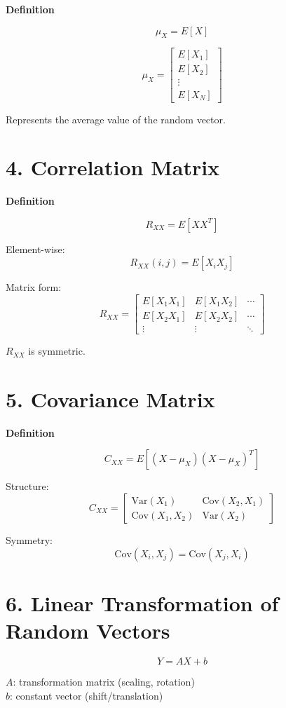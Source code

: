 \documentclass[12pt]{article}
\begin{document}
\textbf{Definition}

\[
\mu_X = E[X]
\]

\[
\mu_X =
\begin{bmatrix}
E[X_1] \\
E[X_2] \\
\vdots \\
E[X_N]
\end{bmatrix}
\]

Represents the average value of the random vector.

\section*{4. Correlation Matrix}

\textbf{Definition}

\[
R_{XX} = E[XX^T]
\]

Element-wise:
\[
R_{XX}(i,j) = E[X_i X_j]
\]

Matrix form:
\[
R_{XX} =
\begin{bmatrix}
E[X_1 X_1] & E[X_1 X_2] & \cdots \\
E[X_2 X_1] & E[X_2 X_2] & \cdots \\
\vdots & \vdots & \ddots
\end{bmatrix}
\]

$R_{XX}$ is symmetric.

\section*{5. Covariance Matrix}

\textbf{Definition}

\[
C_{XX} = E[(X - \mu_X)(X - \mu_X)^T]
\]

Structure:
\[
C_{XX} =
\begin{bmatrix}
\text{Var}(X_1) & \text{Cov}(X_2,X_1) \\
\text{Cov}(X_1,X_2) & \text{Var}(X_2)
\end{bmatrix}
\]

Symmetry:
\[
\text{Cov}(X_i,X_j) = \text{Cov}(X_j,X_i)
\]

\section*{6. Linear Transformation of Random Vectors}

\[
Y = AX + b
\]

$A$: transformation matrix (scaling, rotation) \\
$b$: constant vector (shift/translation)
\end{document}
